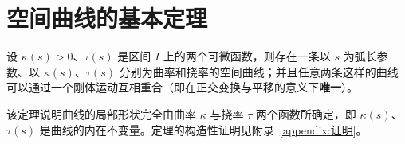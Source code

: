 \section{空间曲线的基本定理}

\begin{theorem}[曲线论基本定理]
	设 $\kappa(s)>0$、$\tau(s)$ 是区间 $I$ 上的两个可微函数，则存在一条以 $s$ 为弧长参数、以 $\kappa(s)$、$\tau(s)$ 分别为曲率和挠率的空间曲线；并且任意两条这样的曲线可以通过一个刚体运动互相重合（即在正交变换与平移的意义下\textbf{唯一}）。
\end{theorem}

\begin{remark}
	该定理说明曲线的局部形状完全由曲率 $\kappa$ 与挠率 $\tau$ 两个函数所确定，即 $\kappa(s)$、$\tau(s)$ 是曲线的内在不变量。定理的构造性证明见附录~\ref{appendix:证明}。
\end{remark}
